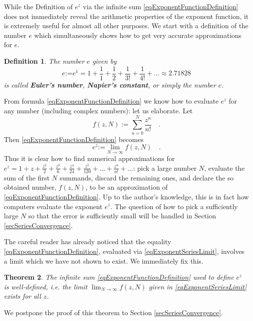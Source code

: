 \documentclass[12pt]{book}
\newcommand{\eqdef}{\textbf{:=}}
\newtheorem{theorem}{Theorem}[section]
\newtheorem{definition}[theorem]{Definition}
\renewcommand{\emph}{\textbf}
\begin{document}
While the Definition of $e^z$ via the infinite sum \eqref{eqExponentFunctionDefinition} does not immediately reveal the arithmetic properties of the exponent function, it is extremely useful for almost all other purposes. We start with a definition of the number $e$ which simultaneously shows how to get very accurate approximations for $e$.
\begin{definition}\label{defE} 
The number $e$ given by
\[
e\eqdef e^1= 1+ \frac{1}{1} +\frac{1}2 +\frac{1}{3!} +\frac{1}{4!}+\dots \approx 2.71828
\]
is called \emph{Euler's number}, \emph{Napier's constant}, or simply the number $e$.
\end{definition}
From formula \eqref{eqExponentFunctionDefinition} we know how to evaluate $e^z$ for any number (including complex numbers): let us elaborate. Let
\begin{equation}\label{eqExponentSeriesLimit}
\displaystyle f(z,N):=\sum\limits_{n=0}^{N} \frac{z^n}{n!}\quad .
\end{equation}
Then \eqref{eqExponentFunctionDefinition} becomes
\[
e^z\eqdef \displaystyle\lim\limits_{N\to \infty} f(z, N)\quad .
\]
Thus it is clear how to find numerical approximations for $e^z= 1+z+\frac{z^{2}}{2} +\frac{z^3}{6} +\frac{z^4}{24} +\frac{z^5}{120} +\dots+\frac{z^n}{n!}+\dots$: pick a large number $N$, evaluate the sum of the first $N$ summands, discard the remaining ones, and declare the so obtained number, $f(z,N)$, to be an approximation of \eqref{eqExponentFunctionDefinition}. Up to the author's knowledge, this is in fact how computers evaluate the exponent $e^z$. The question of how to pick a sufficiently large $N$ so that the error is sufficiently small will be handled in Section \ref{secSeriesConvergence}.

The careful reader has already noticed that the equality \eqref{eqExponentFunctionDefinition}, evaluated via \eqref{eqExponentSeriesLimit}, involves a limit which we have not shown to exist. We immediately fix this.
\begin{theorem} The infinite sum \eqref{eqExponentFunctionDefinition} used to define $e^z$ is well-defined, i.e. the limit $\displaystyle\lim_{N\to \infty} f(z, N)$ given in \eqref{eqExponentSeriesLimit} exists for all $z$.
\end{theorem}
We postpone the proof of this theorem to Section \ref{secSeriesConvergence}.
\end{document}
